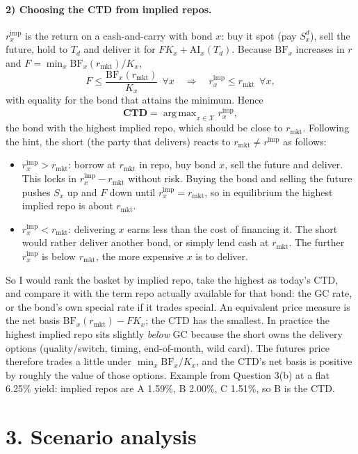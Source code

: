 \documentclass[11pt]{article}
\DeclareMathOperator*{\argmax}{arg\,max}
\newcommand{\AI}{\mathrm{AI}}
\newcommand{\BF}{\mathrm{BF}}
\begin{document}
\paragraph{2) Choosing the CTD from implied repos.}
$r^{\text{imp}}_x$ is the return on a cash-and-carry with bond $x$: buy it spot (pay $S^{d}_x$), sell the future, hold to $T_d$ and deliver it for $F K_x+\AI_x(T_d)$. Because $\BF_x$ increases in $r$ and $F=\min_x \BF_x(r_{\text{mkt}})/K_x$,
\[
F\le\frac{\BF_x(r_{\text{mkt}})}{K_x}\ \ \forall x
\quad\Longrightarrow\quad
r^{\text{imp}}_x\le r_{\text{mkt}}\ \ \forall x,
\]
with equality for the bond that attains the minimum. Hence
\[
\textbf{CTD}=\argmax_{x\in\mathcal X} r^{\text{imp}}_x ,
\]
the bond with the highest implied repo, which should be close to $r_{\text{mkt}}$. Following the hint, the short (the party that delivers) reacts to $r_{\text{mkt}}\ne r^{\text{imp}}$ as follows:
\begin{itemize}[leftmargin=*]
\item $r^{\text{imp}}_x>r_{\text{mkt}}$: borrow at $r_{\text{mkt}}$ in repo, buy bond $x$, sell the future and deliver. This locks in $r^{\text{imp}}_x-r_{\text{mkt}}$ without risk. Buying the bond and selling the future pushes $S_x$ up and $F$ down until $r^{\text{imp}}_x=r_{\text{mkt}}$, so in equilibrium the highest implied repo is about $r_{\text{mkt}}$.
\item $r^{\text{imp}}_x<r_{\text{mkt}}$: delivering $x$ earns less than the cost of financing it. The short would rather deliver another bond, or simply lend cash at $r_{\text{mkt}}$. The further $r^{\text{imp}}_x$ is below $r_{\text{mkt}}$, the more expensive $x$ is to deliver.
\end{itemize}
So I would rank the basket by implied repo, take the highest as today's CTD, and compare it with the term repo actually available for that bond: the GC rate, or the bond's own special rate if it trades special. An equivalent price measure is the net basis $\BF_x(r_{\text{mkt}})-F K_x$; the CTD has the smallest. In practice the highest implied repo sits slightly \emph{below} GC because the short owns the delivery options (quality/switch, timing, end-of-month, wild card). The futures price therefore trades a little under $\min_x \BF_x/K_x$, and the CTD's net basis is positive by roughly the value of those options. Example from Question 3(b) at a flat 6.25\% yield: implied repos are A 1.59\%, B 2.00\%, C 1.51\%, so B is the CTD.

\section*{3. Scenario analysis}
\end{document}
